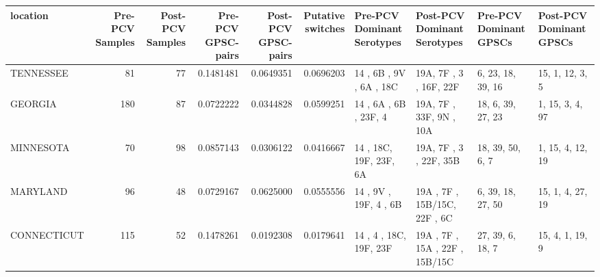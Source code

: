 
\begin{tabular}{l|r|r|r|r|r|l|l|l|l}
\hline
location & Pre-PCV Samples & Post-PCV Samples & Pre-PCV GPSC-pairs & Post-PCV GPSC-pairs & Putative switches & Pre-PCV Dominant Serotypes & Post-PCV Dominant Serotypes & Pre-PCV Dominant GPSCs & Post-PCV Dominant GPSCs\\
\hline
TENNESSEE & 81 & 77 & 0.1481481 & 0.0649351 & 0.0696203 & 14 , 6B , 9V , 6A , 18C & 19A, 7F , 3  , 16F, 22F & 6, 23, 18, 39, 16 & 15, 1, 12, 3, 5\\
\hline
GEORGIA & 180 & 87 & 0.0722222 & 0.0344828 & 0.0599251 & 14 , 6A , 6B , 23F, 4 & 19A, 7F , 33F, 9N , 10A & 18, 6, 39, 27, 23 & 1, 15, 3, 4, 97\\
\hline
MINNESOTA & 70 & 98 & 0.0857143 & 0.0306122 & 0.0416667 & 14 , 18C, 19F, 23F, 6A & 19A, 7F , 3  , 22F, 35B & 18, 39, 50, 6, 7 & 1, 15, 4, 12, 19\\
\hline
MARYLAND & 96 & 48 & 0.0729167 & 0.0625000 & 0.0555556 & 14 , 9V , 19F, 4  , 6B & 19A    , 7F     , 15B/15C, 22F    , 6C & 6, 39, 18, 27, 50 & 15, 1, 4, 27, 19\\
\hline
CONNECTICUT & 115 & 52 & 0.1478261 & 0.0192308 & 0.0179641 & 14 , 4  , 18C, 19F, 23F & 19A    , 7F     , 15A    , 22F    , 15B/15C & 27, 39, 6, 18, 7 & 15, 4, 1, 19, 9\\
\hline
\end{tabular}
